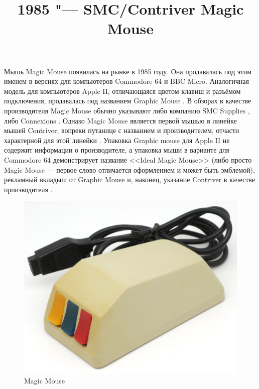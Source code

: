 \documentclass[11pt, a4paper]{article}
\begin{document}
\title{1985 "--- SMC/Contriver Magic Mouse}
\date{}
\maketitle
{}

Мышь Magic Mouse появилась на рынке в 1985 году. Она продавалась под этим именем в версиях для компьютеров Commodore 64 и BBC Micro. Аналогичная модель для компьютеров Apple II, отличающаяся цветом клавиш и разъёмом подключения, продавалась под названием Graphic Mouse \cite{SMC_Mouse_Commodore1}. В обзорах в качестве производителя Magic Mouse обычно указывают либо компанию SMC Supplies \cite{c64wiki, SMC_Mouse_Commodore3}, либо Connexions \cite{SMC_Mouse_Commodore2}. Однако Magic Mouse является первой мышью в линейке мышей Contriver, вопреки путанице с названием и производителем, отчасти характерной для этой линейки \cite{reddit}. Упаковка Graphic mouse для Apple II не содержит информации о производителе, а упаковка мыши в варианте для Commodore 64 демонстрирует название <<Ideal Magic Mouse>> (либо просто Magic Mouse --- первое слово отличается оформлением и может быть  эмблемой), рекламный вкладыш от Graphic Mouse и, наконец, указание Contriver в качестве  производителя \cite{CHM}.

\begin{figure}[h]
   \centering
    \includegraphics[scale=0.6]{1985_smc_contriver_magic_mouse/pic_30.jpg}
    \caption{Magic Mouse}
    \label{fig:MagicMousePic}
\end{figure}
\end{document}
